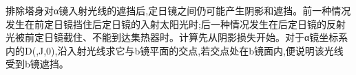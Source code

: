 排除塔身对α镜入射光线的遮挡后,定日镜之间仍可能产生阴影和遮挡。前一种情况发生在前定日镜挡住后定日镜的入射太阳光时;后一种情况发生在后定日镜的反射光被前定日镜截住、不能到达集热器时。计算先从阴影损失开始。对于α镜坐标系内的D(,J,0),沿入射光线求它与b镜平面的交点,若交点处在b镜面内,便说明该光线受到b镜遮挡。
